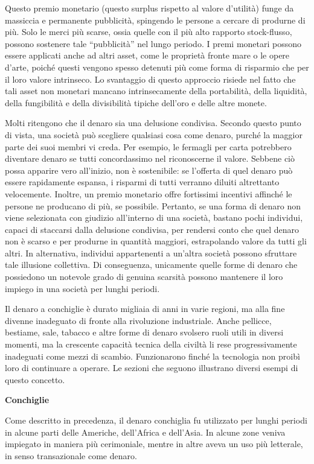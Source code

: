 \documentclass[
  a5paper,
  smalldemyvopaper,10pt,twoside,onecolumn,openright,extrafontsizes,hidelinks]{memoir}
\begin{document}
Questo premio monetario (questo surplus rispetto al valore d'utilità)
funge da massiccia e permanente pubblicità, spingendo le persone a
cercare di produrne di più. Solo le merci più scarse, ossia quelle con
il più alto rapporto stock-flusso, possono sostenere tale ``pubblicità''
nel lungo periodo. I premi monetari possono essere applicati anche ad
altri asset, come le proprietà fronte mare o le opere d'arte, poiché
questi vengono spesso detenuti più come forma di risparmio che per il
loro valore intrinseco. Lo svantaggio di questo approccio risiede nel
fatto che tali asset non monetari mancano intrinsecamente della
portabilità, della liquidità, della fungibilità e della divisibilità
tipiche dell'oro e delle altre monete.

Molti ritengono che il denaro sia una delusione condivisa. Secondo
questo punto di vista, una società può scegliere qualsiasi cosa come
denaro, purché la maggior parte dei suoi membri vi creda. Per esempio,
le fermagli per carta potrebbero diventare denaro se tutti concordassimo
nel riconoscerne il valore. Sebbene ciò possa apparire vero all'inizio,
non è sostenibile: se l'offerta di quel denaro può essere rapidamente
espansa, i risparmi di tutti verranno diluiti altrettanto velocemente.
Inoltre, un premio monetario offre fortissimi incentivi affinché le
persone ne producano di più, se possibile. Pertanto, se una forma di
denaro non viene selezionata con giudizio all'interno di una società,
bastano pochi individui, capaci di staccarsi dalla delusione condivisa,
per rendersi conto che quel denaro non è scarso e per produrne in
quantità maggiori, estrapolando valore da tutti gli altri. In
alternativa, individui appartenenti a un'altra società possono sfruttare
tale illusione collettiva. Di conseguenza, unicamente quelle forme di
denaro che possiedono un notevole grado di genuina scarsità possono
mantenere il loro impiego in una società per lunghi periodi.

Il denaro a conchiglie è durato migliaia di anni in varie regioni, ma
alla fine divenne inadeguato di fronte alla rivoluzione industriale.
Anche pellicce, bestiame, sale, tabacco e altre forme di denaro svolsero
ruoli utili in diversi momenti, ma la crescente capacità tecnica della
civiltà li rese progressivamente inadeguati come mezzi di scambio.
Funzionarono finché la tecnologia non proibì loro di continuare a
operare. Le sezioni che seguono illustrano diversi esempi di questo
concetto.

\textbf{Conchiglie}

Come descritto in precedenza, il denaro conchiglia fu utilizzato per
lunghi periodi in alcune parti delle Americhe, dell'Africa e dell'Asia.
In alcune zone veniva impiegato in maniera più cerimoniale, mentre in
altre aveva un uso più letterale, in senso transazionale come denaro.
\end{document}

